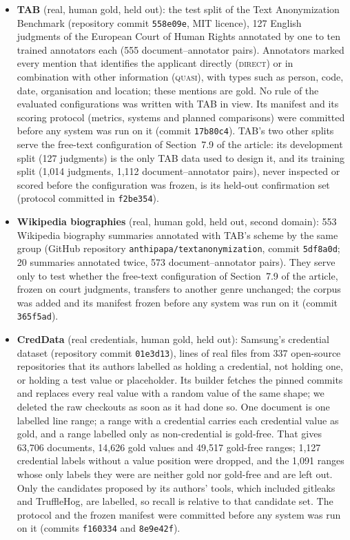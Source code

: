 \documentclass[11pt,a4paper]{article}
\begin{document}
\begin{itemize}
\item \textbf{TAB} (real, human gold, held out): the test split of the Text Anonymization Benchmark (repository commit \texttt{558e09e}, MIT licence), 127 English judgments of the European Court of Human Rights annotated by one to ten trained annotators each (555 document--annotator pairs). Annotators marked every mention that identifies the applicant directly (\textsc{direct}) or in combination with other information (\textsc{quasi}), with types such as person, code, date, organisation and location; these mentions are gold. No rule of the evaluated configurations was written with TAB in view. Its manifest and its scoring protocol (metrics, systems and planned comparisons) were committed before any system was run on it (commit \texttt{17b80c4}). TAB's two other splits serve the free-text configuration of Section~7.9 of the article: its development split (127 judgments) is the only TAB data used to design it, and its training split (1,014 judgments, 1,112 document--annotator pairs), never inspected or scored before the configuration was frozen, is its held-out confirmation set (protocol committed in \texttt{f2be354}).
\item \textbf{Wikipedia biographies} (real, human gold, held out, second domain): 553 Wikipedia biography summaries annotated with TAB's scheme by the same group (GitHub repository \texttt{anthipapa/\allowbreak textanonymization}, commit \texttt{5df8a0d}; 20 summaries annotated twice, 573 document--annotator pairs). They serve only to test whether the free-text configuration of Section~7.9 of the article, frozen on court judgments, transfers to another genre unchanged; the corpus was added and its manifest frozen before any system was run on it (commit \texttt{365f5ad}).
\item \textbf{CredData} (real credentials, human gold, held out): Samsung's credential dataset (repository commit \texttt{01e3d13}), lines of real files from 337 open-source repositories that its authors labelled as holding a credential, not holding one, or holding a test value or placeholder. Its builder fetches the pinned commits and replaces every real value with a random value of the same shape; we deleted the raw checkouts as soon as it had done so. One document is one labelled line range; a range with a credential carries each credential value as gold, and a range labelled only as non-credential is gold-free. That gives 63,706 documents, 14,626 gold values and 49,517 gold-free ranges; 1,127 credential labels without a value position were dropped, and the 1,091 ranges whose only labels they were are neither gold nor gold-free and are left out. Only the candidates proposed by its authors' tools, which included gitleaks and TruffleHog, are labelled, so recall is relative to that candidate set. The protocol and the frozen manifest were committed before any system was run on it (commits \texttt{f160334} and \texttt{8e9e42f}).
\end{itemize}
\end{document}
